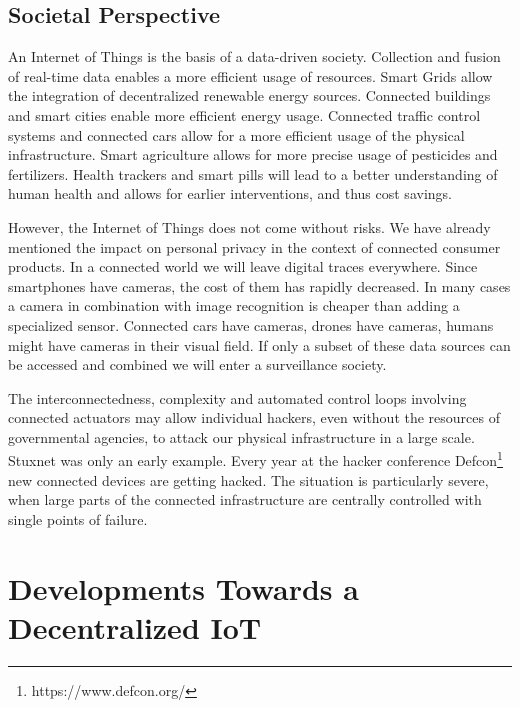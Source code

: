 
\subsection{Societal Perspective}

An Internet of Things is the basis of a data-driven society. Collection and fusion of real-time data enables a more efficient usage of resources. Smart Grids allow the integration of decentralized renewable energy sources. Connected buildings and smart cities enable more efficient energy usage. Connected traffic control systems and connected cars allow for a more efficient usage of the physical infrastructure. Smart agriculture allows for more precise usage of pesticides and fertilizers. Health trackers and smart pills will lead to a better understanding of human health and allows for earlier interventions, and thus cost savings. 

However, the Internet of Things does not come without risks. We have already mentioned the impact on personal privacy in the context of connected consumer products. In a connected world we will leave digital traces everywhere. Since smartphones have cameras, the cost of them has rapidly decreased. In many cases a camera in combination with image recognition is cheaper than adding a specialized sensor. Connected cars have cameras, drones have cameras, humans might have cameras in their visual field. If only a subset of these data sources can be accessed and combined we will enter a surveillance society. 

The interconnectedness, complexity and automated control loops involving connected actuators may allow individual hackers, even without the resources of governmental agencies, to attack our physical infrastructure in a large scale. Stuxnet \parencite{5772960} was only an early example. Every year at the hacker conference Defcon\footnote{https://www.defcon.org/} new connected devices are getting hacked. The situation is particularly severe, when large parts of the connected infrastructure are centrally controlled with single points of failure. 


\section{Developments Towards a Decentralized IoT}


